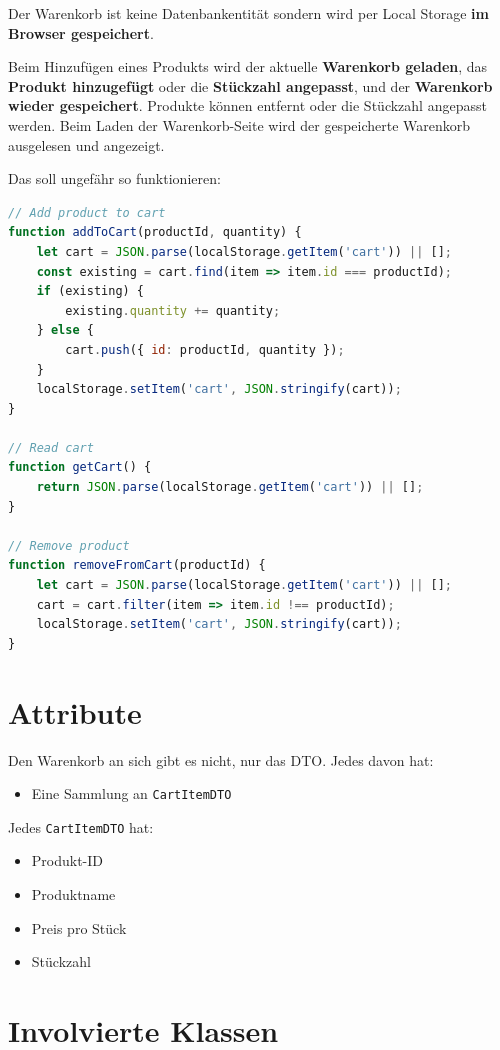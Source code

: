 \documentclass[12pt, a4paper]{scrreprt}
\begin{document}
	Der Warenkorb ist keine Datenbankentität sondern wird per Local Storage \textbf{im Browser gespeichert}.
	
	Beim Hinzufügen eines Produkts wird der aktuelle \textbf{Warenkorb geladen}, das \textbf{Produkt hinzugefügt} oder die \textbf{Stückzahl angepasst}, und der \textbf{Warenkorb wieder gespeichert}. Produkte können entfernt oder die Stückzahl angepasst werden. Beim Laden der Warenkorb-Seite wird der gespeicherte Warenkorb ausgelesen und angezeigt.
	
	Das soll ungefähr so funktionieren:
	
			\begin{lstlisting}[style=IntelliJPurple, language=JavaScript]
// Add product to cart
function addToCart(productId, quantity) {
	let cart = JSON.parse(localStorage.getItem('cart')) || [];
	const existing = cart.find(item => item.id === productId);
	if (existing) {
		existing.quantity += quantity;
	} else {
		cart.push({ id: productId, quantity });
	}
	localStorage.setItem('cart', JSON.stringify(cart));
}

// Read cart
function getCart() {
	return JSON.parse(localStorage.getItem('cart')) || [];
}

// Remove product
function removeFromCart(productId) {
	let cart = JSON.parse(localStorage.getItem('cart')) || [];
	cart = cart.filter(item => item.id !== productId);
	localStorage.setItem('cart', JSON.stringify(cart));
}
	\end{lstlisting}
	
	\section{Attribute}
	
	Den Warenkorb an sich gibt es nicht, nur das DTO. Jedes davon hat:
	\begin{itemize}
		\item Eine Sammlung an \texttt{CartItemDTO}
	\end{itemize}
	
	Jedes \texttt{CartItemDTO} hat:
	\begin{itemize}
		\item Produkt-ID
		\item Produktname
		\item Preis pro Stück
		\item Stückzahl
	\end{itemize}
	
	\section{Involvierte Klassen}
	
\end{document}
